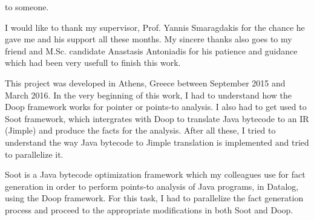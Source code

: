 \documentclass{dithesis}
\begin{document}
\begin{thesisdedication}
to someone.
\end{thesisdedication}

\begin{thesisacknowledgments}[ACKNOWLEDGEMENTS]
    I would like to thank my supervisor, Prof. Yannis Smaragdakis for the chance he gave me and his support all these months.
    My sincere thanks also goes to my friend and M.Sc. candidate Anastasis Antoniadis for his patience and guidance which had been very usefull to finish this work.
\end{thesisacknowledgments}

\renewcommand\contentsname{Contents}
\renewcommand\listfigurename{List of Figures}
\renewcommand\listtablename{List of Tables}
\renewcommand{\figurename}{Figure}
\renewcommand{\cftfigpresnum}{Figure }
\renewcommand{\tablename}{Table}
\renewcommand{\cfttabpresnum}{Table }

\tableofcontents
\listoffigures
\listoftables



\begin{thesisprologue}[PREFACE]
    This project was developed in Athens, Greece between September 2015 and March 2016. In the very beginning of this work, I had to understand how the Doop framework works for pointer or points-to analysis. I also had to get used to Soot framework, which intergrates with Doop to translate Java bytecode to an IR (Jimple) and produce the facts for the analysis. After all these, I tried to understand the way Java bytecode to Jimple translation is implemented and tried to parallelize it. 
\end{thesisprologue}

    Soot is a Java bytecode optimization framework which my colleagues use for fact generation in order to perform points-to analysis of Java programs, in Datalog, using the Doop framework. For this task, I had to parallelize the fact generation process and proceed to the appropriate modifications in both Soot and Doop. 
\end{document}
